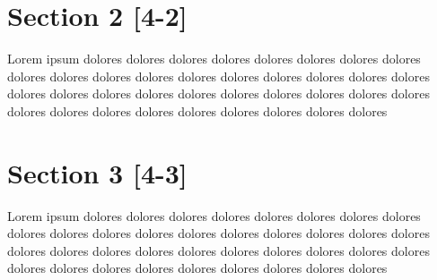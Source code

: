 \section{Section 2 [4-2]}
\label{sec:32another}
Lorem ipsum dolores dolores dolores dolores dolores dolores dolores dolores dolores dolores dolores dolores dolores dolores dolores dolores dolores dolores dolores dolores dolores dolores dolores dolores dolores dolores dolores dolores dolores dolores dolores dolores dolores dolores dolores dolores dolores

\section{Section 3 [4-3]}
\label{sec:33another}
Lorem ipsum dolores dolores dolores dolores dolores dolores dolores dolores dolores dolores dolores dolores dolores dolores dolores dolores dolores dolores dolores dolores dolores dolores dolores dolores dolores dolores dolores dolores dolores dolores dolores dolores dolores dolores dolores dolores dolores